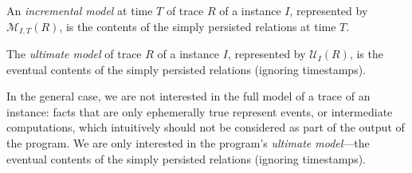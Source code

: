 \begin{definition}
%
An {\em incremental model} at time $T$ of trace $R$ of a \lang instance $I$,
represented by $\mathcal{M}_{I,T}(R)$, is the contents of the simply persisted
relations at time $T$.
%
\end{definition}

\begin{definition}
%
The {\em ultimate model} of trace $R$ of a \lang instance $I$, represented by
$\mathcal{U}_I(R)$, is the eventual contents of the simply persisted relations
(ignoring timestamps).
%
\end{definition}

In the general case, we are not interested in the full model of a trace of an
instance: facts that are only ephemerally true represent events, or intermediate
computations, which intuitively should not be considered as part of the output
of the program.  We are only interested in the program's {\em ultimate
  model}---the eventual contents of the simply persisted relations (ignoring
timestamps).
